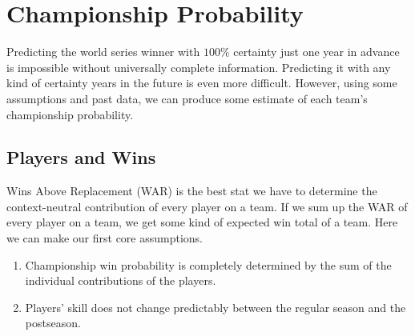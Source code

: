 \documentclass[11pt]{article}
\begin{document}
\section{Championship Probability}
Predicting the world series winner with $100\%$ certainty just one year in advance is impossible without universally complete information. Predicting it with any kind of certainty years in the future is even more difficult. However, using some assumptions and past data, we can produce some estimate of each team's championship probability.

\subsection{Players and Wins}

Wins Above Replacement (WAR) is the best stat we have to determine the context-neutral contribution of every player on a team. If we sum up the WAR of every player on a team, we get some kind of expected win total of a team. Here we can make our first core assumptions.

\begin{enumerate}
	\item Championship win probability is completely determined by the sum of the individual contributions of the players.
	\item Players' skill does not change predictably between the regular season and the postseason.
\end{enumerate}
\end{document}
